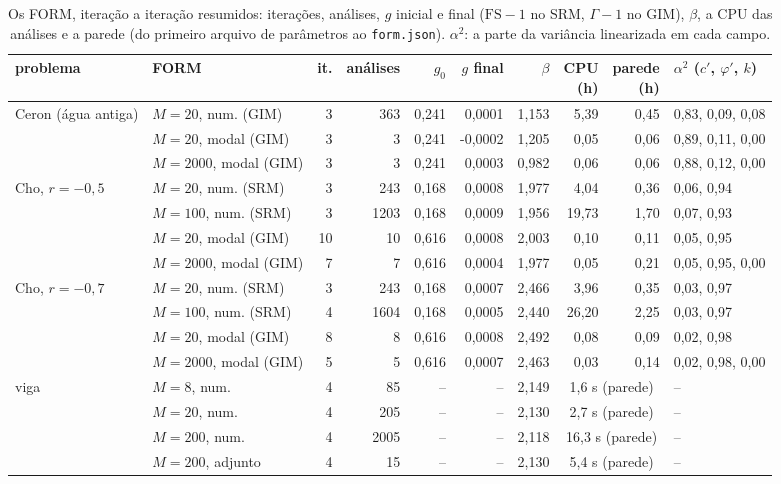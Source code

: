 \begin{table}[H]\centering\footnotesize\setlength{\tabcolsep}{3pt}
\caption{Os FORM, iteração a iteração resumidos: iterações, análises, $g$ inicial e final ($\mathrm{FS} - 1$ no SRM, $\Gamma - 1$ no GIM), $\beta$, a CPU das análises e a parede (do primeiro arquivo de parâmetros ao \texttt{form.json}). $\alpha^2$: a parte da variância linearizada em cada campo.}\label{tab:formit}
\begin{tabular}{llrrrrrrrl}\toprule
problema & FORM & it. & análises & $g_0$ & $g$ final & $\beta$ & \makecell{CPU\\(h)} & \makecell{parede\\(h)} & \makecell{$\alpha^2$\\($c'$, $\varphi'$, $k$)} \\\midrule
Ceron (água antiga) & $M = 20$, num. (GIM) & 3 & 363 & 0,241 & 0,0001 & 1,153 & 5,39 & 0,45 & 0,83, 0,09, 0,08 \\
 & $M = 20$, modal (GIM) & 3 & 3 & 0,241 & -0,0002 & 1,205 & 0,05 & 0,06 & 0,89, 0,11, 0,00 \\
 & $M = 2000$, modal (GIM) & 3 & 3 & 0,241 & 0,0003 & 0,982 & 0,06 & 0,06 & 0,88, 0,12, 0,00 \\
Cho, $r = -0{,}5$ & $M = 20$, num. (SRM) & 3 & 243 & 0,168 & 0,0008 & 1,977 & 4,04 & 0,36 & 0,06, 0,94 \\
 & $M = 100$, num. (SRM) & 3 & 1203 & 0,168 & 0,0009 & 1,956 & 19,73 & 1,70 & 0,07, 0,93 \\
 & $M = 20$, modal (GIM) & 10 & 10 & 0,616 & 0,0008 & 2,003 & 0,10 & 0,11 & 0,05, 0,95 \\
 & $M = 2000$, modal (GIM) & 7 & 7 & 0,616 & 0,0004 & 1,977 & 0,05 & 0,21 & 0,05, 0,95, 0,00 \\
Cho, $r = -0{,}7$ & $M = 20$, num. (SRM) & 3 & 243 & 0,168 & 0,0007 & 2,466 & 3,96 & 0,35 & 0,03, 0,97 \\
 & $M = 100$, num. (SRM) & 4 & 1604 & 0,168 & 0,0005 & 2,440 & 26,20 & 2,25 & 0,03, 0,97 \\
 & $M = 20$, modal (GIM) & 8 & 8 & 0,616 & 0,0008 & 2,492 & 0,08 & 0,09 & 0,02, 0,98 \\
 & $M = 2000$, modal (GIM) & 5 & 5 & 0,616 & 0,0007 & 2,463 & 0,03 & 0,14 & 0,02, 0,98, 0,00 \\
viga & $M = 8$, num. & 4 & 85 & -- & -- & 2,149 & \multicolumn{2}{c}{1,6 s (parede)} & -- \\
 & $M = 20$, num. & 4 & 205 & -- & -- & 2,130 & \multicolumn{2}{c}{2,7 s (parede)} & -- \\
 & $M = 200$, num. & 4 & 2005 & -- & -- & 2,118 & \multicolumn{2}{c}{16,3 s (parede)} & -- \\
 & $M = 200$, adjunto & 4 & 15 & -- & -- & 2,130 & \multicolumn{2}{c}{5,4 s (parede)} & -- \\
\bottomrule\end{tabular}\end{table}
